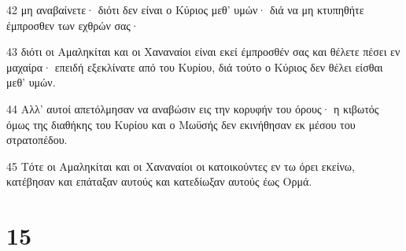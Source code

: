 \par 42 μη αναβαίνετε· διότι δεν είναι ο Κύριος μεθ' υμών· διά να μη κτυπηθήτε έμπροσθεν των εχθρών σας·
\par 43 διότι οι Αμαληκίται και οι Χαναναίοι είναι εκεί έμπροσθέν σας και θέλετε πέσει εν μαχαίρα· επειδή εξεκλίνατε από του Κυρίου, διά τούτο ο Κύριος δεν θέλει είσθαι μεθ' υμών.
\par 44 Αλλ' αυτοί απετόλμησαν να αναβώσιν εις την κορυφήν του όρους· η κιβωτός όμως της διαθήκης του Κυρίου και ο Μωϋσής δεν εκινήθησαν εκ μέσου του στρατοπέδου.
\par 45 Τότε οι Αμαληκίται και οι Χαναναίοι οι κατοικούντες εν τω όρει εκείνω, κατέβησαν και επάταξαν αυτούς και κατεδίωξαν αυτούς έως Ορμά.

\chapter{15}

